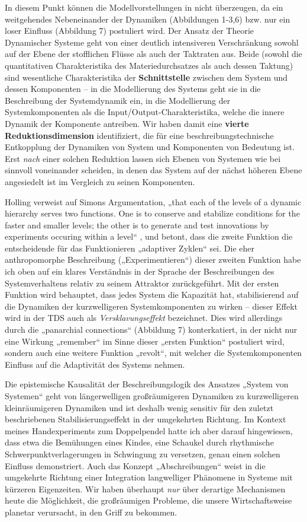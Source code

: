 \documentclass[11pt,a4paper]{article}
\begin{document}
In diesem Punkt können die Modellvorstellungen in \cite{Holling2000} nicht
überzeugen, da ein weitgehendes Nebeneinander der Dynamiken (Abbildungen
1-3,6) bzw. nur ein loser Einfluss (Abbildung 7) postuliert wird. Der Ansatz
der Theorie Dynamischer Systeme geht von einer deutlich intensiveren
Verschränkung sowohl auf der Ebene der stoff\-lichen Flüsse als auch der
Taktraten aus. Beide (sowohl die quantitativen Charakteristika des
Materiedurchsatzes als auch dessen Taktung) sind wesentliche Charakteristika
der \textbf{Schnittstelle} zwischen dem System und dessen Komponenten -- in
die Modellierung des Systems geht sie in die Beschreibung der Systemdynamik
ein, in die Modellierung der Systemkomponenten als die
Input/Output-Charakteristika, welche die innere Dynamik der Komponente
antreiben. Wir haben damit eine \textbf{vierte Reduktionsdimension}
identifiziert, die für eine beschreibungstechnische Entkopplung der Dynamiken
von System und Komponenten von Bedeutung ist. Erst \emph{nach} einer solchen
Reduktion lassen sich Ebenen von Systemen wie bei \cite{Holling2000} sinnvoll
voneinander scheiden, in denen das System auf der nächst höheren Ebene
angesiedelt ist im Vergleich zu seinen Komponenten.

Holling verweist auf Simons Argumentation, „that each of the levels of a
dynamic hierarchy serves two functions. One is to conserve and stabilize
conditions for the faster and smaller levels; the other is to generate and
test innovations by experiments occuring within a level“
\cite[S. 393]{Holling2000}, und betont, dass die zweite Funktion die
entscheidende für das Funktionieren „adaptiver Zyklen“ sei. Die eher
anthropomorphe Beschreibung („Experimentieren“) dieser zweiten Funktion habe
ich oben auf ein klares Verständnis in der Sprache der Beschreibungen des
Systemverhaltens relativ zu seinem Attraktor zurückgeführt. Mit der ersten
Funktion wird behauptet, dass jedes System die Kapazität hat, stabilisierend
auf die Dynamiken der kurzwelligeren Systemkomponenten zu wirken -- dieser
Effekt wird in der TDS auch als \emph{Versklavungseffekt} bezeichnet. Dies
wird allerdings durch die „panarchial connections“ (Abbildung 7)
konterkatiert, in der nicht nur eine Wirkung „remember“ im Sinne dieser
„ersten Funktion“ postuliert wird, sondern auch eine weitere Funktion
„revolt“, mit welcher die Systemkomponenten Einfluss auf die Adaptivität des
Systems nehmen.

Die epistemische Kausalität der Beschreibungslogik des Ansatzes „System von
Systemen“ geht von längerwelligen großräumigeren Dynamiken zu kurzwelligeren
kleinräumigeren Dynamiken und ist deshalb wenig sensitiv für den zuletzt
beschriebenen Stabilisierungseffekt in der umgekehrten Richtung. Im Kontext
meines Handexperiments zum Doppelpendel hatte ich aber darauf hingewiesen,
dass etwa die Bemühungen eines Kindes, eine Schaukel durch rhythmische
Schwerpunktverlagerungen in Schwingung zu versetzen, genau einen solchen
Einfluss demonstriert. Auch das Konzept „Abschreibungen“ weist in die
umgekehrte Richtung einer Integration langwelliger Phänomene in Systeme mit
kürzeren Eigenzeiten. Wir haben überhaupt \emph{nur} über derartige
Mechanismen heute die Möglichkeit, die großräumigen Probleme, die unsere
Wirtschaftsweise planetar verursacht, in den Griff zu bekommen.
\end{document}
